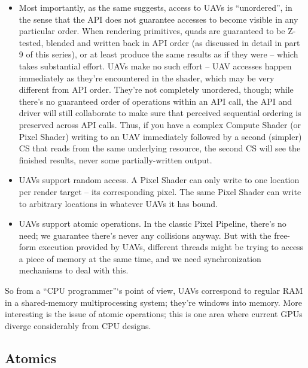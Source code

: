 \documentclass[12pt]{article}
\begin{document}
\begin{itemize}
\item Most importantly, as the same suggests, access to UAVs is “unordered”, in the sense that the API does not guarantee accesses to become visible in any particular order. When rendering primitives, quads are guaranteed to be Z-tested, blended and written back in API order (as discussed in detail in part 9 of this series), or at least produce the same results as if they were – which takes substantial effort. UAVs make no such effort – UAV accesses happen immediately as they’re encountered in the shader, which may be very different from API order. They’re not completely unordered, though; while there’s no guaranteed order of operations within an API call, the API and driver will still collaborate to make sure that perceived sequential ordering is preserved across API calls. Thus, if you have a complex Compute Shader (or Pixel Shader) writing to an UAV immediately followed by a second (simpler) CS that reads from the same underlying resource, the second CS will see the finished results, never some partially-written output.

\item UAVs support random access. A Pixel Shader can only write to one location per render target – its corresponding pixel. The same Pixel Shader can write to arbitrary locations in whatever UAVs it has bound.

\item UAVs support atomic operations. In the classic Pixel Pipeline, there’s no need; we guarantee there’s never any collisions anyway. But with the free-form execution provided by UAVs, different threads might be trying to access a piece of memory at the same time, and we need synchronization mechanisms to deal with this.
\end{itemize}

So from a “CPU programmer”‘s point of view, UAVs correspond to regular RAM in a shared-memory multiprocessing system; they’re windows into memory. More interesting is the issue of atomic operations; this is one area where current GPUs diverge considerably from CPU designs.

\subsection{Atomics}
\label{sec:org7de0658}
\end{document}
